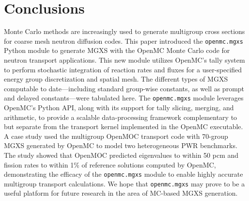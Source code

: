 \section{Conclusions}
\label{sec:conclusions}

Monte Carlo methods are increasingly used to generate multigroup cross sections for coarse mesh neutron diffusion codes. This paper introduced the \texttt{openmc.mgxs} Python module to generate MGXS with the OpenMC Monte Carlo code for neutron transport applications. This new module utilizes OpenMC's tally system to perform stochastic integration of reaction rates and fluxes for a user-specified energy group discretization and spatial mesh. The different types of MGXS computable to date---including standard group-wise constants, as well as prompt and delayed constants---were tabulated here. The \texttt{openmc.mgxs} module leverages OpenMC's Python API, along with its support for tally slicing, merging, and arithmetic, to provide a scalable data-processing framework complementary to but separate from the transport kernel implemented in the OpenMC executable. A case study used the multigroup OpenMOC transport code with 70-group MGXS generated by OpenMC to model two heterogeneous PWR benchmarks. The study showed that OpenMOC predicted eigenvalues to within 50 pcm and fission rates to within 1\% of reference solutions computed by OpenMC, demonstrating the efficacy of the \texttt{openmc.mgxs} module to enable highly accurate multigroup transport calculations. We hope that \texttt{openmc.mgxs} may prove to be a useful platform for future research in the area of MC-based MGXS generation.

